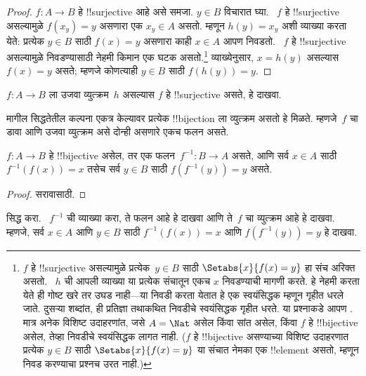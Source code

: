 \documentclass[../../../include/open-logic-section]{subfiles}
\begin{document}
\begin{proof}
$f\colon A \to B$ हे !!{surjective} आहे असे समजा. $y \in B$ विचारात घ्या.
~$f$ हे !!{surjective} असल्यामुळे $f(x_y) = y$ असणारा एक $x_y \in A$
असतो. म्हणून $h(y) = x_y$ अशी व्याख्या करता येते: प्रत्येक $y \in B$
साठी $f(x) = y$ असणारा काही $x \in A$ आपण निवडतो. ~$f$ हे
!!{surjective} असल्यामुळे निवडण्यासाठी नेहमी किमान एक घटक असतो.\footnote{
$f$ हे !!{surjective} असल्यामुळे प्रत्येक~$y \in B$ साठी
$\Setabs{x}{f(x) = y}$ हा संच अरिक्त असतो. ~$h$ ची आपली व्याख्या
या प्रत्येक संचातून एकच $x$ निवडण्याची मागणी करते. हे नेहमी करता येते
ही गोष्ट खरे तर उघड नाही---या निवडी करता येतात हे एक स्वयंसिद्धक म्हणून
गृहीत धरले जाते. दुसऱ्या शब्दांत, ही प्रतिज्ञा तथाकथित निवडीचे स्वयंसिद्धक
गृहीत धरते. या प्रश्नाकडे आपण .
मात्र अनेक विशिष्ट उदाहरणांत, जसे $A = \Nat$ असेल किंवा सांत असेल,
किंवा $f$ हे !!{bijective} असेल, तेव्हा निवडीचे स्वयंसिद्धक लागत नाही.
($f$ हे !!{bijective} असण्याच्या विशिष्ट उदाहरणात प्रत्येक $y \in B$
साठी $\Setabs{x}{f(x) = y}$ या संचात नेमका एक !!{element} असतो,
म्हणून निवड करण्याचा प्रश्नच उरत नाही.)}
व्याख्येनुसार, $x = h(y)$ असल्यास $f(x) = y$ असते; म्हणजे कोणत्याही
$y \in B$ साठी $f(h(y)) = y$.
\end{proof}

\begin{prob}
$f\colon A \to B$ ला उजवा व्युत्क्रम~$h$ असल्यास $f$ हे
!!{surjective} असते, हे दाखवा.
\end{prob}

\begin{explain}
  मागील सिद्धतेतील कल्पना एकत्र केल्यावर प्रत्येक !!{bijection} ला
  व्युत्क्रम असतो हे मिळते. म्हणजे~$f$ चा डावा आणि उजवा व्युत्क्रम
  असे दोन्ही असणारे एकच फलन असते.
\end{explain}

\begin{prop}
$f\colon A \to B$ हे !!{bijective} असेल, तर एक
फलन~$f^{-1}\colon B \to A$ असते, आणि सर्व $x \in A$ साठी
$f^{-1}(f(x)) = x$ तसेच सर्व $y \in B$ साठी $f(f^{-1}(y)) = y$ असते.
\end{prop}

\begin{proof}
सरावासाठी.
\end{proof}

\begin{prob}
 सिद्ध करा. ~$f^{-1}$ ची
व्याख्या करा, ते फलन आहे हे दाखवा आणि ते~$f$ चा व्युत्क्रम आहे हे
दाखवा. म्हणजे, सर्व $x \in A$ आणि $y \in B$ साठी
$f^{-1}(f(x)) = x$ आणि $f(f^{-1}(y)) = y$ हे दाखवा.
\end{prob}
\end{document}

